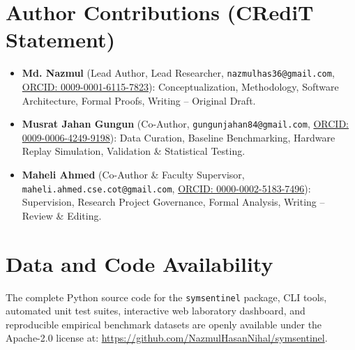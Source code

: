 \documentclass[aps,pra,twocolumn,superscriptaddress,10pt,floatfix]{revtex4-2}
\begin{document}
\section*{Author Contributions (CRediT Statement)}
\begin{itemize}
    \item \textbf{Md. Nazmul} (Lead Author, Lead Researcher, \texttt{nazmulhas36@gmail.com}, \href{https://orcid.org/0009-0001-6115-7823}{\textsf{ORCID: 0009-0001-6115-7823}}): Conceptualization, Methodology, Software Architecture, Formal Proofs, Writing -- Original Draft.
    \item \textbf{Musrat Jahan Gungun} (Co-Author, \texttt{gungunjahan84@gmail.com}, \href{https://orcid.org/0009-0006-4249-9198}{\textsf{ORCID: 0009-0006-4249-9198}}): Data Curation, Baseline Benchmarking, Hardware Replay Simulation, Validation \& Statistical Testing.
    \item \textbf{Maheli Ahmed} (Co-Author \& Faculty Supervisor, \texttt{maheli.ahmed.cse.cot@gmail.com}, \href{https://orcid.org/0000-0002-5183-7496}{\textsf{ORCID: 0000-0002-5183-7496}}): Supervision, Research Project Governance, Formal Analysis, Writing -- Review \& Editing.
\end{itemize}

\section*{Data and Code Availability}
The complete Python source code for the \texttt{symsentinel} package, CLI tools, automated unit test suites, interactive web laboratory dashboard, and reproducible empirical benchmark datasets are openly available under the Apache-2.0 license at: \url{https://github.com/NazmulHasanNihal/symsentinel}.



\appendix
\end{document}

